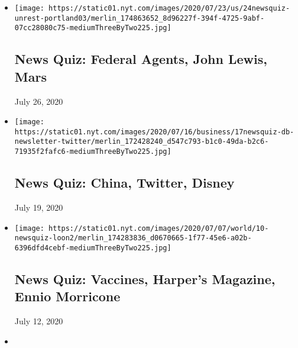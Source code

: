 \begin{itemize}
\item
  \href{https://www.nytimes.com/interactive/2020/07/24/briefing/federal-agents-john-lewis-mars-news-quiz.html}{}

  \texttt{[image: https://static01.nyt.com/images/2020/07/23/us/24newsquiz-unrest-portland03/merlin\_174863652\_8d96227f-394f-4725-9abf-07cc28080c75-mediumThreeByTwo225.jpg]}

  \hypertarget{news-quiz-federal-agents-john-lewis-mars}{%
  \subsection{News Quiz: Federal Agents, John Lewis,
  Mars}\label{news-quiz-federal-agents-john-lewis-mars}}

  July 26, 2020
\item
  \href{https://www.nytimes.com/interactive/2020/07/17/briefing/china-twitter-disney-news-quiz.html}{}

  \texttt{[image: https://static01.nyt.com/images/2020/07/16/business/17newsquiz-db-newsletter-twitter/merlin\_172428240\_d547c793-b1c0-49da-b2c6-71935f2fafc6-mediumThreeByTwo225.jpg]}

  \hypertarget{news-quiz-china-twitter-disney}{%
  \subsection{News Quiz: China, Twitter,
  Disney}\label{news-quiz-china-twitter-disney}}

  July 19, 2020
\item
  \href{https://www.nytimes.com/interactive/2020/07/10/briefing/vaccines-harpers-magazine-ennio-morricone-news-quiz.html}{}

  \texttt{[image: https://static01.nyt.com/images/2020/07/07/world/10-newsquiz-loon2/merlin\_174283836\_d0670665-1f77-45e6-a02b-6396dfd4cebf-mediumThreeByTwo225.jpg]}

  \hypertarget{news-quiz-vaccines-harpers-magazine-ennio-morricone}{%
  \subsection{News Quiz: Vaccines, Harper's Magazine, Ennio
  Morricone}\label{news-quiz-vaccines-harpers-magazine-ennio-morricone}}

  July 12, 2020
\item
  \href{https://www.nytimes.com/interactive/2020/07/03/briefing/russia-carl-reiner-supreme-court-news-quiz.html}{}


\end{itemize}
